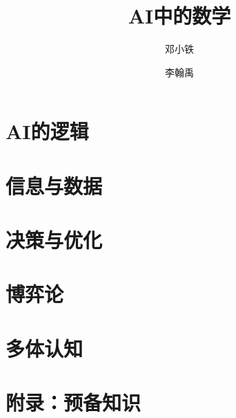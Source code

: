 \documentclass[10pt,oneside,fontset=none]{ctexbook}
\title{AI中的数学}
\author{邓小铁}
\author{李翰禹}
\affil{}
\date{\lastcompiled}
\begin{document}
\frontmatter
\maketitle
% 
\tableofcontents

\mainmatter



\part{AI的逻辑}\label{part:AI-logic}



\part{信息与数据}\label{part:information-data}




\part{决策与优化}\label{part:decision-optimization}




\part{博弈论}\label{part:logic-game}


\part{多体认知}\label{part:cognitive-logic}



\appendix
\part{附录：预备知识}




\backmatter
{}


\end{document}
